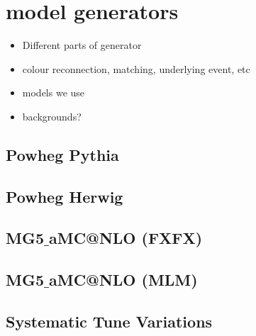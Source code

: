\section{\ttbar{} model generators}
\label{sec:ttMC}

\begin{itemize}
	\item Different parts of generator
	\item colour reconnection, matching, underlying event, etc
	\item models we use
	\item backgrounds?
\end{itemize}

\subsection{Powheg Pythia}
\label{ssec:ttPowPyth}
\subsection{Powheg Herwig}
\label{ssec:ttPowHer}
\subsection{MG5$\_$aMC@NLO (FXFX)}
\label{ssec:ttamc}
\subsection{MG5$\_$aMC@NLO (MLM)}
\label{ssec:ttmad}

\subsection{Systematic Tune Variations}
\label{ssec:ttsys}